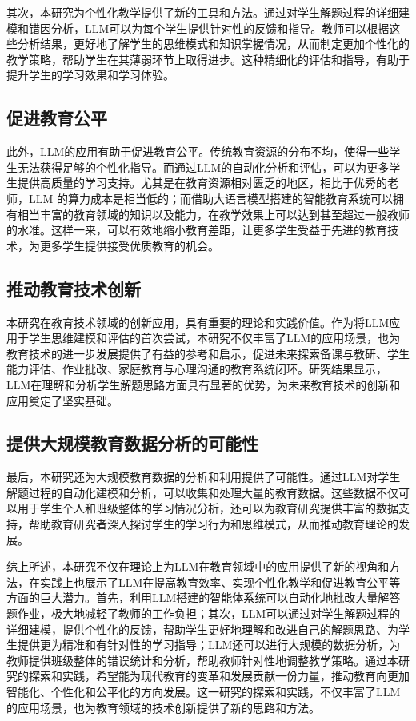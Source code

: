 其次，本研究为个性化教学提供了新的工具和方法。通过对学生解题过程的详细建模和错因分析，LLM可以为每个学生提供针对性的反馈和指导。教师可以根据这些分析结果，更好地了解学生的思维模式和知识掌握情况，从而制定更加个性化的教学策略，帮助学生在其薄弱环节上取得进步。这种精细化的评估和指导，有助于提升学生的学习效果和学习体验。

\subsection{促进教育公平}

此外，LLM的应用有助于促进教育公平。传统教育资源的分布不均，使得一些学生无法获得足够的个性化指导。而通过LLM的自动化分析和评估，可以为更多学生提供高质量的学习支持。尤其是在教育资源相对匮乏的地区，相比于优秀的老师，LLM 的算力成本是相当低的；而借助大语言模型搭建的智能教育系统可以拥有相当丰富的教育领域的知识以及能力，在教学效果上可以达到甚至超过一般教师的水准。这样一来，可以有效地缩小教育差距，让更多学生受益于先进的教育技术，为更多学生提供接受优质教育的机会。

\subsection{推动教育技术创新}

本研究在教育技术领域的创新应用，具有重要的理论和实践价值。作为将LLM应用于学生思维建模和评估的首次尝试，本研究不仅丰富了LLM的应用场景，也为教育技术的进一步发展提供了有益的参考和启示，促进未来探索备课与教研、学生能力评估、作业批改、家庭教育与心理沟通的教育系统闭环。研究结果显示，LLM在理解和分析学生解题思路方面具有显著的优势，为未来教育技术的创新和应用奠定了坚实基础。

\subsection{提供大规模教育数据分析的可能性}

最后，本研究还为大规模教育数据的分析和利用提供了可能性。通过LLM对学生解题过程的自动化建模和分析，可以收集和处理大量的教育数据。这些数据不仅可以用于学生个人和班级整体的学习情况分析，还可以为教育研究提供丰富的数据支持，帮助教育研究者深入探讨学生的学习行为和思维模式，从而推动教育理论的发展。

综上所述，本研究不仅在理论上为LLM在教育领域中的应用提供了新的视角和方法，在实践上也展示了LLM在提高教育效率、实现个性化教学和促进教育公平等方面的巨大潜力。首先，利用LLM搭建的智能体系统可以自动化地批改大量解答题作业，极大地减轻了教师的工作负担；其次，LLM可以通过对学生解题过程的详细建模，提供个性化的反馈，帮助学生更好地理解和改进自己的解题思路、为学生提供更为精准和有针对性的学习指导；LLM还可以进行大规模的数据分析，为教师提供班级整体的错误统计和分析，帮助教师针对性地调整教学策略。通过本研究的探索和实践，希望能为现代教育的变革和发展贡献一份力量，推动教育向更加智能化、个性化和公平化的方向发展。这一研究的探索和实践，不仅丰富了LLM的应用场景，也为教育领域的技术创新提供了新的思路和方法。
